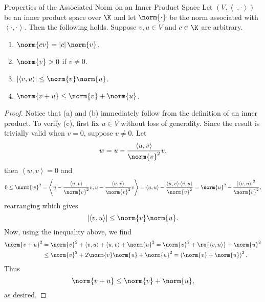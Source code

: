 \documentclass[linearalgebra]{subfiles}
\begin{document}
    \begin{theorem}{Properties of the Associated Norm on an Inner Product Space}
        Let $\left( V, \left\langle \cdot, \cdot\right\rangle  \right)$ be an inner product space over $\K$ and let $\norm{\cdot}$ be the norm associated with $\left\langle \cdot, \cdot\right\rangle$. Then the following holds. Suppose $v,u\in V$ and $c\in\K$ are arbitrary.
        \begin{enumerate}
            \item $\norm{cv} = \left| c \right|\norm{v}$.
            \item $\norm{v} > 0$ if $v\neq 0$.
            \item $\left| \left\langle v, u\right\rangle  \right| \leq \norm{v}\norm{u}$.
            \item $\norm{v+u}\leq \norm{v}+\norm{u}$.
        \end{enumerate}
    \end{theorem}

    \begin{proof}
        Notice that (a) and (b) immediately follow from the definition of an inner product. To verify (c), first fix $u\in V$ without loss of generality. Since the result is trivially valid when $v=0$, suppose $v\neq 0$. Let
        \begin{equation*}
            w = u - \frac{\left\langle u, v\right\rangle }{\norm{v}^2}v,
        \end{equation*}
        then $\left\langle w, v\right\rangle = 0$ and
        \begin{equation*}
            0\leq \norm{w}^2 = \left\langle u-\frac{\left\langle u, v\right\rangle }{\norm{v}^2}v, u-\frac{\left\langle u, v\right\rangle }{\norm{v}^2}v\right\rangle = \left\langle u, u\right\rangle - \frac{\left\langle u, v\right\rangle \left\langle v, u\right\rangle }{\norm{v}^2} = \norm{u}^2 - \frac{\left|\left\langle v, u\right\rangle\right| ^2}{\norm{v}^2},
        \end{equation*}
        rearranging which gives
        \begin{equation*}
            \left| \left\langle v, u\right\rangle  \right| \leq \norm{v}\norm{u}.
        \end{equation*}
        Now, using the inequality above, we find
        \begin{align*}
            \norm{v+u}^2 & = \norm{v}^2 + \left\langle v, u\right\rangle + \left\langle u, v\right\rangle + \norm{u}^2 = \norm{v}^2 + \re{\left\langle v, u\right\rangle } + \norm{u}^2 \\
                         & \leq \norm{v}^2 + 2\norm{v}\norm{u} + \norm{u}^2 = \left( \norm{v} + \norm{u} \right)^2.
        \end{align*} 
        Thus
        \begin{equation*}
            \norm{v+u}\leq \norm{v} + \norm{u},
        \end{equation*}
        as desired.
    \end{proof}
\end{document}
